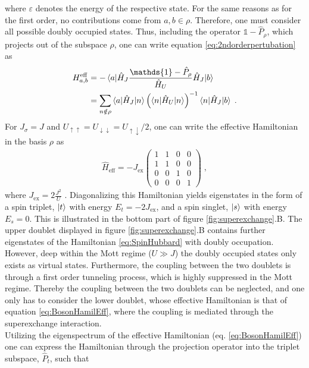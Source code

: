 where $\varepsilon$ denotes the energy of the respective state. For the same reasons as for the first order, no contributions come from $a,b \in \rho$. Therefore, one must consider all possible doubly occupied states. Thus, including the operator $\mathds{1} - \hat{P}_{\rho}$, which projects out of the subspace $\rho$, one can write equation \eqref{eq:2ndorderpertubation} as
\begin{align}
	H_{a,b}^{\mathrm{eff}} &=  - \braket{a|\hat{H}_J \frac{\mathds{1} - \hat{P}_{\rho}}{\hat{H}_U} \hat{H}_J|b} \nonumber \\
	&= \sum_{n \notin \rho} \braket{a|\hat{H}_J|n} \left( \braket{n |\hat{H}_U | n} \right)^{-1} \braket{n|\hat{H}_J|b} \; .
\end{align}
For $J_{\sigma} = J $ and $U_{\uparrow\uparrow} = U_{\downarrow\downarrow} = U_{\uparrow\downarrow}/2$, one can write the effective Hamiltonian in the basis $\rho$ as
\begin{align}
\hat{H}_{\mathrm{eff}} = -J_{\mathrm{ex}} \begin{pmatrix}
           1 & 1 & 0 & 0 \\
           1 & 1 & 0 & 0 \\
           0 & 0 & 1 & 0 \\
           0 & 0 & 0 & 1 
         \end{pmatrix} \; , \label{eq:BosonHamilEff}
\end{align}
where $J_{\mathrm{ex}} = 2 \frac{J^2}{U}$ \cite{Duan2003}. Diagonalizing this Hamiltonian yields eigenstates in the form of a spin triplet, $\ket{t}$ with energy $E_t = -2 J_{\mathrm{ex}}$, and a spin singlet, $\ket{s}$ with energy $E_s = 0$. This is illustrated in the bottom part of figure \ref{fig:superexchange}.B. The upper doublet displayed in figure \ref{fig:superexchange}.B contains further eigenstates of the Hamiltonian \eqref{eq:SpinHubbard} with doubly occupation. However, deep within the Mott regime ($U \gg J$) the doubly occupied states only exists as virtual states. Furthermore, the coupling between the two doublets is through a first order tunneling process, which is highly suppressed in the Mott regime. Thereby the coupling between the two doublets can be neglected, and one only has to consider the lower doublet, whose effective Hamiltonian is that of equation \eqref{eq:BosonHamilEff}, where the coupling is mediated through the superexchange interaction.\\
Utilizing the eigenspectrum of the effective Hamiltonian (eq. \eqref{eq:BosonHamilEff}) one can express the Hamiltonian through the projection operator into the triplet subspace, $\hat{P}_t$, such that
